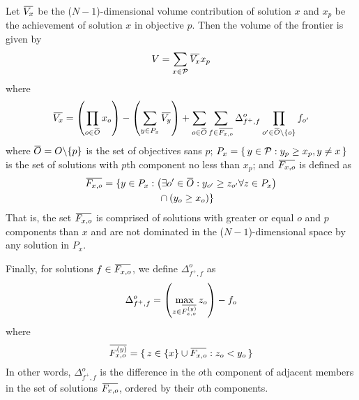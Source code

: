 \documentclass[11pt,letterpaper]{article}
\newcommand{\overbar}[1]{\mkern 1.5mu\overline{\mkern-1.5mu#1\mkern-1.5mu}\mkern 1.5mu}
\begin{document}
Let
$\overbar{V_x}$ be the ($N-1$)-dimensional volume contribution of solution $x$ and
$x_p$ be the achievement of solution $x$ in objective $p$.
Then the volume of the frontier is given by
\begin{align}
V = \sum_{x \in \mathcal{P}} \overbar{V_x} x_p
\end{align}
where
\begin{align*}
\overbar{V_x} = \left( \prod_{o \in \overbar{O}} x_o \right) - 
  \left( \sum_{y \in P_x} \overbar{V_y} \right) + 
  \sum_{o \in \overbar{O}}
    \sum_{f \in \overbar{F_{x,o}}}
      \Delta_{f^+,f}^o
      \prod_{o' \in \overbar{O} \backslash \{o\}} f_{o'}
\end{align*}
where
$\overbar{O} = O \backslash \{p\}$ is the set of objectives sans $p$; 
$P_x = \set{y \in \mathcal{P} : y_p \ge x_p, y \neq x}$ is the set of solutions with $p$th component no less than $x_p$; and  
$\overbar{F_{x,o}}$ is defined as
\begin{equation}
\begin{split}
\overbar{F_{x,o}} = \{ y \in P_x &: \left( \exists o' \in \overbar{O} : y_{o'} \ge z_{o'} \forall z \in P_x \right) \\
 &\quad \cap (y_o \ge x_o) \}
\end{split}
\end{equation}
That is, the set $\overbar{F_{x,o}}$ is comprised of solutions with greater or equal $o$ and $p$ components than $x$ and are not dominated in the ($N-1$)-dimensional space by any solution in $P_x$.

Finally, for solutions $f \in \overbar{F_{x,o}}$, we define $\Delta_{f^+,f}^o$ as
\begin{equation}
\Delta_{f^+,f}^o = \left( \max_{z \in \overbar{F_{x,o}^{(y)}}} z_o \right) - f_o
\end{equation}
where
\begin{equation}
\overbar{F_{x,o}^{(y)}} = \set{z \in \{x\} \cup \overbar{F_{x,o}} : z_o < y_o}
\end{equation}
In other words, $\Delta_{f^+,f}^o$ is the difference in the $o$th component of adjacent members in the set of solutions $\overbar{F_{x,o}}$, ordered by their $o$th components.
\end{document}
